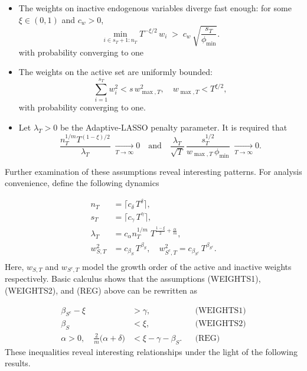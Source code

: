 \documentclass[10pt,a4paper,oneside]{article}
\begin{document}
\begin{itemize}
\begin{enumerate}
    \end{enumerate}

  \item[(WEIGHTS1)] The weights on inactive endogenous variables diverge fast enough: for some $\xi\in(0,1)$ and $c_w>0$,
  \[
    \min_{i \in s_T + 1 : n_T} T^{-\xi/2}\,w_i \;>\; c_w\,\sqrt{\frac{s_T}{\phi_{\min}}}.
  \]
  with probability converging to one
  \item[(WEIGHTS2)] The weights on the active set are uniformly bounded: 
  \[
     \sum_{i=1}^{s_T} w_i^2 < s\,w_{\max, T}^2,\quad w_{\max, T}<T^{\xi/2},
  \]
  with probability converging to one.
\end{itemize}

\begin{itemize}
    \item[(REG)] Let $\lambda_T>0$ be the Adaptive‐LASSO penalty parameter.  It is required that
\[
   \frac{n_T^{1/m}T^{(1-\xi)/2}}{\lambda_T}\;\xrightarrow[T \to \infty]{} 0
   \quad\text{and}\quad
   \frac{\lambda_T}{\sqrt{T}}\,\frac{s_T^{1/2}}{w_{\max, T}\,\phi_{\min}}\; \xrightarrow[T \to \infty]{} 0.
\]
\end{itemize}

Further examination of these assumptions reveal interesting patterns. For analysis convenience, define the following dynamics

\begin{align*}
n_T &= \lceil c_{\delta}\,T^{\delta} \rceil, \\[6pt]
s_T &= \lceil c_{\gamma}\,T^{\gamma} \rceil, \\[6pt]
\lambda_T &= c_{\alpha} n_T^{1/m}\;T^{\frac{1-\xi}{2} + \frac{\alpha}{m}}, \\[6pt]
w_{S,T}^2 &= c_{\beta_S}\,T^{\beta_S}, 
\quad
w_{S^c,T}^2 = c_{\beta_{S^c}}\,T^{\beta_{S^c}}.
\\[4pt]
\end{align*}
Here, $w_{S,T}$ and $w_{S^c,T}$ model the growth order of the active and inactive weights respectively. Basic calculus shows that the assumptions (WEIGHTS1), (WEIGHTS2), and (REG) above can be rewritten as

\begin{align*}
\beta_{S^c} - \xi &> \gamma, 
  &&\text{(WEIGHTS1)}\\
\beta_S &< \xi, 
  &&\text{(WEIGHTS2)}\\
\alpha > 0,\quad 
\frac{2}{m}\bigl(\alpha + \delta\bigr) &< \xi - \gamma - \beta_S. 
  &&\text{(REG)}
\end{align*}
These inequalities reveal interesting relationships under the light of the following results.
\end{document}
